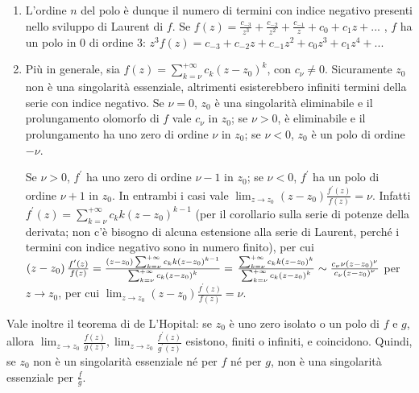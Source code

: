\documentclass{article}
\begin{document}
\begin{enumerate}
\item L'ordine $n$ del polo \`{e} dunque il numero di termini con indice
negativo presenti nello sviluppo di Laurent di $f$. Se $f\left( z\right) =%
\frac{c_{-3}}{z^{3}}+\frac{c_{-2}}{z^{2}}+\frac{c_{-1}}{z}+c_{0}+c_{1}z+...$%
, $f$ ha un polo in $0$ di ordine $3$: $z^{3}f\left( z\right)
=c_{-3}+c_{-2}z+c_{-1}z^{2}+c_{0}z^{3}+c_{1}z^{4}+...$

\item Pi\`{u} in generale, sia $f\left( z\right) =\sum_{k=\nu }^{+\infty
}c_{k}\left( z-z_{0}\right) ^{k}$, con $c_{\nu }\neq 0$. Sicuramente $z_{0}$
non \`{e} una singolarit\`{a} essenziale, altrimenti esisterebbero infiniti
termini della serie con indice negativo. Se $\nu =0$, $z_{0}$ \`{e} una
singolarit\`{a} eliminabile e il prolungamento olomorfo di $f$ vale $c_{\nu
} $ in $z_{0}$; se $\nu >0$, \`{e} eliminabile e il prolungamento ha uno
zero di ordine $\nu $ in $z_{0}$; se $\nu <0$, $z_{0}$ \`{e} un polo di
ordine $-\nu $.

Se $\nu >0$, $f^{\prime }$ ha uno zero di ordine $\nu -1$ in $z_{0}$; se $%
\nu <0$, $f^{\prime }$ ha un polo di ordine $\nu +1$ in $z_{0}$. In entrambi
i casi vale $\lim_{z\rightarrow z_{0}}\left( z-z_{0}\right) \frac{f^{\prime
}\left( z\right) }{f\left( z\right) }=\nu $. Infatti $f^{\prime }\left(
z\right) =\sum_{k=\nu }^{+\infty }c_{k}k\left( z-z_{0}\right) ^{k-1}$ (per
il corollario sulla serie di potenze della derivata; non c'\`{e} bisogno di
alcuna estensione alla serie di Laurent, perch\'{e} i termini con indice
negativo sono in numero finito), per cui $\left( z-z_{0}\right) \frac{%
f^{\prime }\left( z\right) }{f\left( z\right) }=\frac{\left( z-z_{0}\right)
\sum_{k=\nu }^{+\infty }c_{k}k\left( z-z_{0}\right) ^{k-1}}{\sum_{k=\nu
}^{+\infty }c_{k}\left( z-z_{0}\right) ^{k}}=$ $\frac{\sum_{k=\nu }^{+\infty
}c_{k}k\left( z-z_{0}\right) ^{k}}{\sum_{k=\nu }^{+\infty }c_{k}\left(
z-z_{0}\right) ^{k}}\sim \frac{c_{\nu }\nu \left( z-z_{0}\right) ^{\nu }}{%
c_{\nu }\left( z-z_{0}\right) ^{\nu }}$ per $z\rightarrow z_{0}$, per cui $%
\lim_{z\rightarrow z_{0}}\left( z-z_{0}\right) \frac{f^{\prime }\left(
z\right) }{f\left( z\right) }=\nu $.
\end{enumerate}

Vale inoltre il teorema di de L'Hopital: se $z_{0}$ \`{e} uno zero isolato o
un polo di $f$ e $g$, allora $\lim_{z\rightarrow z_{0}}\frac{f\left(
z\right) }{g\left( z\right) },\lim_{z\rightarrow z_{0}}\frac{f^{\prime
}\left( z\right) }{g^{\prime }\left( z\right) }$ esistono, finiti o
infiniti, e coincidono. Quindi, se $z_{0}$ non \`{e} un singolarit\`{a}
essenziale n\'{e} per $f$ n\'{e} per $g$, non \`{e} una singolarit\`{a}
essenziale per $\frac{f}{g}$.
\end{document}
